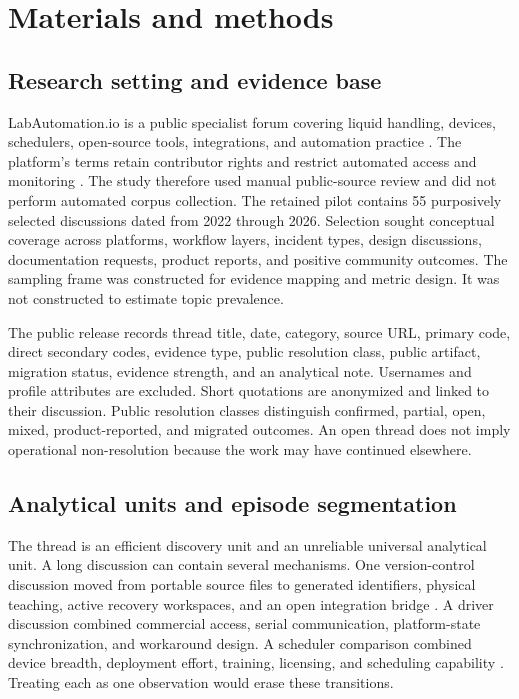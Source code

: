 \section{Materials and methods}
\label{sec:methods}

\subsection{Research setting and evidence base}

LabAutomation.io is a public specialist forum covering liquid handling, devices, schedulers, open-source tools, integrations, and automation practice \cite{labautomation_about,forum_welcome}. The platform's terms retain contributor rights and restrict automated access and monitoring \cite{labautomation_terms}. The study therefore used manual public-source review and did not perform automated corpus collection. The retained pilot contains 55 purposively selected discussions dated from 2022 through 2026. Selection sought conceptual coverage across platforms, workflow layers, incident types, design discussions, documentation requests, product reports, and positive community outcomes. The sampling frame was constructed for evidence mapping and metric design. It was not constructed to estimate topic prevalence.

The public release records thread title, date, category, source URL, primary code, direct secondary codes, evidence type, public resolution class, public artifact, migration status, evidence strength, and an analytical note. Usernames and profile attributes are excluded. Short quotations are anonymized and linked to their discussion. Public resolution classes distinguish confirmed, partial, open, mixed, product-reported, and migrated outcomes. An open thread does not imply operational non-resolution because the work may have continued elsewhere.

\subsection{Analytical units and episode segmentation}

The thread is an efficient discovery unit and an unreliable universal analytical unit. A long discussion can contain several mechanisms. One version-control discussion moved from portable source files to generated identifiers, physical teaching, active recovery workspaces, and an open integration bridge \cite{forum_tecan_git}. A driver discussion combined commercial access, serial communication, platform-state synchronization, and workaround design. A scheduler comparison combined device breadth, deployment effort, training, licensing, and scheduling capability \cite{forum_scheduler_feedback}. Treating each as one observation would erase these transitions.


